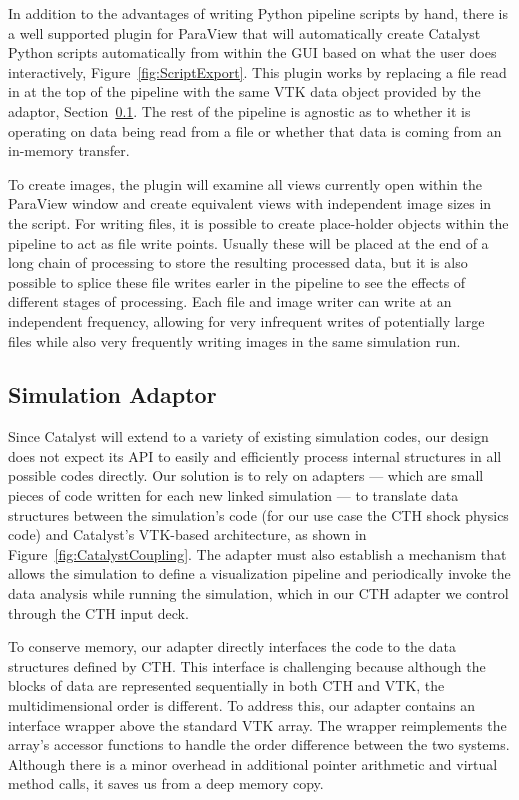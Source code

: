 In addition to the advantages of writing Python pipeline scripts by hand, there
is a well supported plugin for ParaView that will automatically create Catalyst
Python scripts automatically from within the GUI based on what the user
does interactively, Figure~\ref{fig:ScriptExport}.  This plugin works by
replacing a file read in at the top of the pipeline with the same VTK data
object provided by the adaptor, Section~\ref{sec:Adaptor}.  The rest of the
pipeline is agnostic as to whether it is operating on data being read from a
file or whether that data is coming from an in-memory \insitu transfer.  

To create images, the plugin will examine all views currently open within the
ParaView window and create equivalent views with independent image sizes in the
script.  For writing files, it is possible to create place-holder objects
within the pipeline to act as file write points.  Usually these will be placed
at the end of a long chain of processing to store the resulting processed data,
but it is also possible to splice these file writes earler in the pipeline to
see the effects of different stages of processing.  Each file and image writer
can write at an independent frequency, allowing for very infrequent writes of
potentially large files while also very frequently writing images in the same
simulation run.

\subsection{Simulation Adaptor}\label{sec:Adaptor}

Since Catalyst will extend to a variety of existing simulation codes, our
design does not expect its API to easily and efficiently process internal
structures in all possible codes directly.  Our solution is to rely on
adapters --- which are small pieces of code written for each new linked
simulation --- to translate data structures between the simulation's code
(for our use case the CTH shock physics code) and Catalyst's VTK-based
architecture, as shown in Figure~\ref{fig:CatalystCoupling}.  The adapter
must also establish a mechanism that allows the simulation to define a
visualization pipeline and periodically invoke the data analysis while running
the simulation, which in our CTH adapter we control through the CTH input
deck.

To conserve memory, our adapter directly interfaces the \vda code to the
data structures defined by CTH.  This interface is challenging because
although the blocks of data are represented sequentially in both CTH and
VTK, the multidimensional order is different.  To address this, our adapter
contains an interface wrapper above the standard VTK array.  The wrapper
reimplements the array's accessor functions to handle the order difference
between the two systems.  Although there is a minor overhead in additional
pointer arithmetic and virtual method calls, it saves us from a deep memory
copy.

